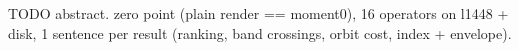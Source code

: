 TODO abstract. zero point (plain render == moment0), 16 operators on l1448 + disk, 1 sentence per result (ranking, band crossings, orbit cost, index + envelope).
